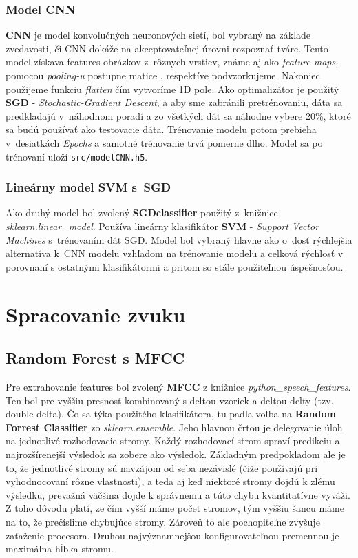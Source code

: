 \documentclass[11pt, a4paper]{article}
\begin{document}
\subsubsection{Model CNN}
\textbf{CNN} je model konvolučných neuronových sietí, bol vybraný na základe zvedavosti, či CNN dokáže na akceptovateľnej úrovni rozpoznať tváre. Tento model získava features obrázkov z~rôznych vrstiev, známe aj ako \emph{feature maps}, pomocou \emph{pooling-u} postupne matice , respektíve podvzorkujeme. Nakoniec použijeme funkciu \emph{flatten} čím vytvoríme 1D pole. Ako optimalizátor je použitý \textbf{SGD} - \emph{Stochastic-Gradient Descent}, a aby sme zabránili pretrénovaniu, dáta sa predkladajú v~náhodnom poradí a zo všetkých dát sa náhodne vybere 20\%, ktoré sa budú používať ako testovacie dáta. Trénovanie modelu potom prebieha v~desiatkách \emph{Epochs} a samotné trénovanie trvá pomerne dlho. Model sa po trénovaní uloží \texttt{src/modelCNN.h5}.
\subsubsection{Lineárny model SVM s~SGD}
Ako druhý model bol zvolený \textbf{SGDclassifier} použitý z~knižnice \emph{sklearn.linear\_model}. Používa lineárny klasifikátor \textbf{SVM} - \emph{Support Vector Machines} s~trénovaním dát SGD. Model bol vybraný hlavne ako o~dosť rýchlejšia alternatíva k~CNN modelu vzhľadom na trénovanie modelu a celková rýchlosť v porovnaní s ostatnými klasifikátormi a pritom so stále použiteľnou úspešnosťou.
	\section{Spracovanie zvuku}
			\subsection{Random Forest s MFCC}
			Pre extrahovanie features bol zvolený \textbf{MFCC} z knižnice \emph{python\_speech\_features}. Ten bol pre vyššiu presnosť kombinovaný s deltou vzoriek a deltou delty (tzv. double delta).
			Čo sa týka použitého klasifikátora, tu padla voľba na \textbf{Random Forrest Classifier} zo \emph{sklearn.ensemble}. Jeho hlavnou črtou je delegovanie úloh na jednotlivé rozhodovacie stromy. Každý rozhodovací strom spraví predikciu a najrozšírenejší výsledok sa zobere ako výsledok. Základným predpokladom ale je to, že jednotlivé stromy sú navzájom od seba nezávislé (čiže používajú pri vyhodnocovaní rôzne vlastnosti), a teda aj keď niektoré stromy dojdú k zlému výsledku, prevažná väčšina dojde k správnemu a túto chybu kvantitatívne vyváži. Z toho dôvodu platí, ze čím vyšší máme počet stromov, tým vyššiu šancu máme na to, že prečíslime chybujúce stromy. Zároveň to ale pochopiteľne zvyšuje zaťaženie procesora. Druhou najvýznamnejšou konfigurovateľnou premennou je maximálna hĺbka stromu.
\end{document}
